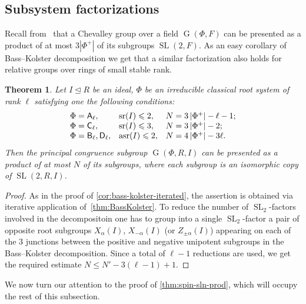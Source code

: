 \documentclass[11pt]{amsart}
\theoremstyle{plain}
\newtheorem{thm}{Theorem}
\numberwithin{equation}{section}
\numberwithin{lemma}{section}
\theoremstyle{definition}
\theoremstyle{remark}
\DeclareMathOperator{\G}{G}
\DeclareMathOperator{\SL}{SL}
\DeclareMathOperator{\sr}{sr}
\DeclareMathOperator{\asr}{asr}
\newcommand{\rA}{\mathsf{A}}
\newcommand{\rB}{\mathsf{B}}
\newcommand{\rC}{\mathsf{C}}
\newcommand{\rD}{\mathsf{D}}
\begin{document}
\subsection{Subsystem factorizations}\label{sec:subsysfact}
Recall from~\cite{LNS11, V13} that a Chevalley group over a field $\G(\Phi, F)$ can be presented as a product of at most $3|\Phi^+|$ of its subgroups $\SL(2, F)$.
As an easy corollary of Bass--Kolster decomposition we get that a similar factorization also holds for relative groups over rings of small stable rank.
\begin{thm}\label{thm:SL2width}
Let $I\trianglelefteq R$ be an ideal, $\Phi$ be an irreducible classical root system of rank $\ell$ satisfying one the following conditions:
\[\begin{array}{l@{\quad}l@{\quad}l}
\Phi=\rA_\ell, & \sr(I)\leqslant 2, & N=3\left|\Phi^+\right| - \ell - 1; \\
\Phi=\rC_\ell, & \sr(I)\leqslant 3, & N=3\left|\Phi^+\right| - 2; \\
\Phi=\rB_\ell, \rD_\ell, & \asr(I)\leqslant 2, & N=4\left|\Phi^+\right| - 3\ell.
\end{array}\]
Then the principal congruence subgroup $\G(\Phi, R, I)$ can be presented as a product of at most $N$ of its subgroups, 
 where each subgroup is an isomorphic copy of $\SL(2, R, I)$.
\end{thm}

\begin{proof}
 As in the proof of \cref{cor:bass-kolster-iterated}, the assertion is obtained via iterative application of~\cref{thm:BassKolster}.
 To reduce the number of $\SL_2$-factors involved in the decompositoin one has to group into a single $\SL_2$-factor a pair of opposite root subgroups $X_{\alpha}(I)$, $X_{-\alpha}(I)$ (or $Z_{\pm\alpha}(I)$) appearing on each
 of the $3$ junctions between the positive and negative unipotent subgroups in the Bass--Kolster decomposition.
 Since a total of $\ell-1$ reductions are used, we get the required estimate $N \leq N' - 3(\ell - 1) + 1$.
\end{proof}

We now turn our attention to the proof of \cref{thm:spin-sln-prod}, which will occupy the rest of this subsection.
\end{document}
